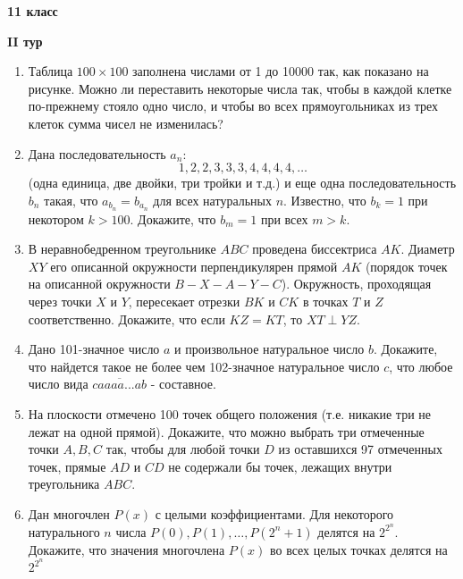 \documentclass{article}
\begin{document}
    \begin{center}
        \LARGE\textbf{11 класс}
    \end{center}
    \begin{center}
        \large\textbf{II тур}
    \end{center}

    \begin{enumerate}[label*=\textbf{\arabic{enumi}.}]
        \setcounter{enumi}{0}
        \item Таблица $100 \times 100$ заполнена числами от 1 до 10000 так, как показано на рисунке.
        Можно ли переставить некоторые числа так, чтобы в каждой клетке по-прежнему стояло одно число, и чтобы во всех прямоугольниках из трех клеток сумма чисел не изменилась?

        \item Дана последовательность $a_n$:
        \[1, 2, 2, 3, 3, 3, 4, 4, 4, 4, \dotsc\]
        (одна единица, две двойки, три тройки и т.д.) и еще одна последовательность $b_n$ такая, что $a_{b_n}
        = b_{a_n}$ для всех натуральных $n$.
        Известно, что $b_k = 1$ при некотором $k > 100$.
        Докажите, что $b_m = 1$ при всех $m > k$.

        \item В неравнобедренном треугольнике $ABC$ проведена биссектриса $AK$.
        Диаметр $XY$ его описанной окружности перпендикулярен прямой $AK$ (порядок точек на описанной окружности $B-X-A-Y-C$). Окружность, проходящая через точки $X$ и $Y$, пересекает отрезки $BK$ и $CK$ в точках $T$ и $Z$ соответственно.
        Докажите, что если $KZ = KT$, то $XT \perp YZ$.

        \item Дано 101-значное число $a$ и произвольное натуральное число $b$.
        Докажите, что найдется такое не более чем 102-значное натуральное число $c$, что любое число вида $\overline{caaaa...ab}$ - составное.

        \item На плоскости отмечено 100 точек общего положения (т.е. никакие три не лежат на одной прямой).
        Докажите, что можно выбрать три отмеченные точки $A, B, C$ так, чтобы для любой точки $D$ из оставшихся 97 отмеченных точек, прямые $AD$ и $CD$ не содержали бы точек, лежащих внутри треугольника $ABC$.

        \item Дан многочлен $P(x)$ с целыми коэффициентами.
        Для некоторого натурального $n$ числа $P(0), P(1), \dotsc, P(2^n +1)$ делятся на $2^{2^n}$.
        Докажите, что значения многочлена $P(x)$ во всех целых точках делятся на $2^{2^n}$


\end{enumerate}
\end{document}
